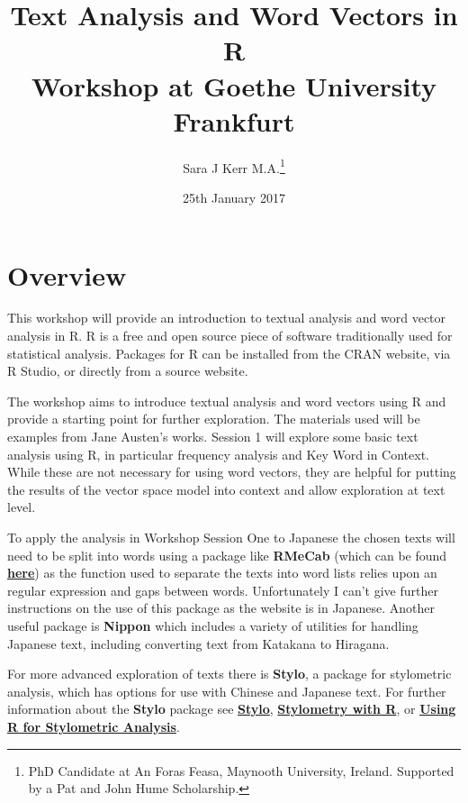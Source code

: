\documentclass[12pt]{article}
\title{{Text Analysis and Word Vectors in R} \\ {Workshop at Goethe University Frankfurt}  \newline }
\author{Sara J Kerr M.A.\thanks{PhD Candidate at An Foras Feasa, Maynooth University, Ireland. \newline Supported by a Pat and John Hume Scholarship.}}
\date{25th January 2017}
\begin{document}
\setlength{\parindent}{0pt}
\setlength{\parskip}{1em}

\begin{titlepage}
\maketitle
\end{titlepage}

\tableofcontents

\section*{Overview}
This workshop will provide an introduction to textual analysis and word vector analysis in R.  R is a free and open source piece of software traditionally used for statistical analysis. Packages for R can be installed from the CRAN website, via R Studio, or directly from a source website.

The workshop aims to introduce textual analysis and word vectors using R and provide a starting point for further exploration. The materials used will be examples from Jane Austen's works. Session 1 will explore some basic text analysis using R, in particular frequency analysis and Key Word in Context. While these are not necessary for using word vectors, they are helpful for putting the results of the vector space model into context and allow exploration at text level.

To apply the analysis in Workshop Session One to Japanese the chosen texts will need to be split into words using a package like \textbf{RMeCab} (which can be found \href{http://rmecab.jp/wiki/index.php?RMeCab}{\textbf{here}}) as the function used to separate the texts into word lists relies upon an regular expression and gaps between words. Unfortunately I can't give further instructions on the use of this package as the website is in Japanese. Another useful package is \textbf{Nippon} which includes a variety of utilities for handling Japanese text, including converting text from Katakana to Hiragana. 

For more advanced exploration of texts there is \textbf{Stylo}, a package for stylometric analysis, which has options for use with Chinese and Japanese text. For further information about the \textbf{Stylo} package see \href{https://cran.r-project.org/web/packages/stylo/stylo.pdf}{\textbf{Stylo}}, \href{https://journal.r-project.org/archive/accepted/eder-rybicki-kestemont.pdf}{\textbf{Stylometry with R}}, or \href{https://my.vanderbilt.edu/digitalhumanities/using-r-for-stylometric-analysis-with-the-stylo-package/}{\textbf{Using R for Stylometric Analysis}}.
\end{document}
